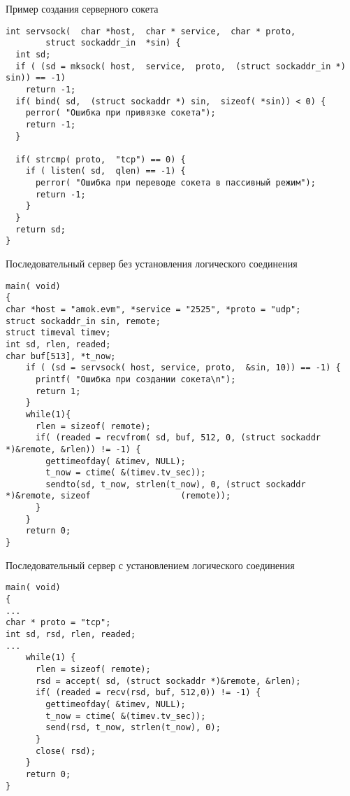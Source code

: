 \begin{frame}[fragile]{Пример создания серверного сокета}
	\scriptsize	
\begin{lstlisting}[Language=C]
int servsock(  char *host,  char * service,  char * proto,  
		struct sockaddr_in	*sin) {
  int sd;
  if ( (sd = mksock( host,  service,  proto,  (struct sockaddr_in *) sin)) == -1)
    return -1;
  if( bind( sd,  (struct sockaddr *) sin,  sizeof( *sin)) < 0) {
    perror( "Ошибка при привязке сокета");
    return -1;
  }

  if( strcmp( proto,  "tcp") == 0) {
    if ( listen( sd,  qlen) == -1) {
      perror( "Ошибка при переводе сокета в пассивный режим");
	  return -1;
    }
  }
  return sd;
}
\end{lstlisting}
	\normalsize
\end{frame}

\begin{frame}[fragile]{Последовательный сервер без установления логического соединения}
	\scriptsize	
\begin{lstlisting}[Language=C]
main( void)
{
char *host = "amok.evm", *service = "2525", *proto = "udp";
struct sockaddr_in sin, remote;
struct timeval timev;
int sd, rlen, readed;
char buf[513], *t_now;
    if ( (sd = servsock( host, service, proto,  &sin, 10)) == -1) {
      printf( "Ошибка при создании сокета\n");
      return 1;
    }
    while(1){
      rlen = sizeof( remote);
      if( (readed = recvfrom( sd, buf, 512, 0, (struct sockaddr *)&remote, &rlen)) != -1) {
        gettimeofday( &timev, NULL);
        t_now = ctime( &(timev.tv_sec));
        sendto(sd, t_now, strlen(t_now), 0, (struct sockaddr *)&remote, sizeof					(remote));
      }
    }
    return 0;
}
\end{lstlisting}
	\normalsize

\end{frame}

\begin{frame}[fragile]{Последовательный сервер с установлением логического соединения}
	\scriptsize	
\begin{lstlisting}[Language=C]
main( void)
{
...
char * proto = "tcp";
int sd, rsd, rlen, readed;
...
    while(1) {
      rlen = sizeof( remote);
      rsd = accept( sd, (struct sockaddr *)&remote, &rlen);
      if( (readed = recv(rsd, buf, 512,0)) != -1) {
        gettimeofday( &timev, NULL);
        t_now = ctime( &(timev.tv_sec));
        send(rsd, t_now, strlen(t_now), 0);
      }
      close( rsd);
    }
    return 0;
}
\end{lstlisting}
	\normalsize
\end{frame}

